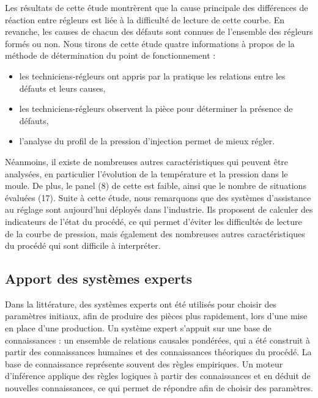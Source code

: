 Les résultats de cette étude montrèrent que la cause principale des différences de réaction entre régleurs est liée à la difficulté de lecture de cette courbe.  %
En revanche, les causes de chacun des défauts sont connues de l’ensemble des régleurs formés ou non.
Nous tirons de cette étude quatre informations à propos de la méthode de détermination du point de fonctionnement :
\begin{itemize}
	\item les techniciens-régleurs ont appris par la pratique les relations entre les défauts et leurs causes,
	\item les techniciens-régleurs observent la pièce pour déterminer la présence de défauts,
	\item l'analyse du profil de la pression d'injection permet de mieux régler.
\end{itemize}
Néanmoins, il existe de nombreuses autres caractéristiques qui peuvent être analysées, en particulier l'évolution de la température et la pression dans le moule.
De plus, le panel (8) de cette est faible, ainsi que le nombre de situations évaluées (17).
Suite à cette étude, nous remarquons que des systèmes d'assistance au réglage sont aujourd'hui déployés dans l'industrie.
Ils proposent de calculer des indicateurs de l’état du procédé, ce qui permet d'éviter les difficultés de lecture de la courbe de pression, mais également des nombreuses autres caractéristiques du procédé qui sont difficile à interpréter.

\subsection{Apport des systèmes experts} \label{subsubsec:initial_expert}
Dans la littérature, des systèmes experts ont été utilisés pour choisir des paramètres initiaux, afin de produire des pièces plus rapidement, lors d'une mise en place d'une production.
Un système expert s’appuit sur une base de connaissances : un ensemble de relations causales pondérées, qui a été construit à partir des connaissances humaines et des connaissances théoriques du procédé.
La base de connaissance représente souvent des règles empiriques.
Un moteur d'inférence applique des règles logiques à partir des connaissances et en déduit de nouvelles connaissances, ce qui permet de répondre afin de choisir des paramètres.

